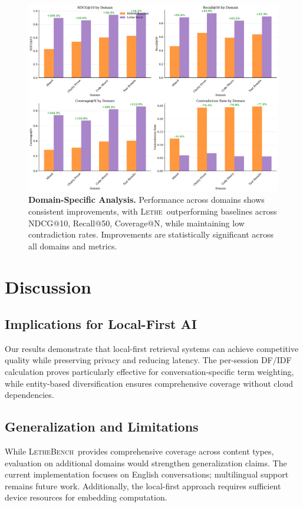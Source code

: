 \documentclass[letterpaper]{article}
\newcommand{\lethe}{\textsc{Lethe}}
\newcommand{\lethebench}{\textsc{LetheBench}}
\begin{document}
\begin{figure}[t]
\centering
\includegraphics[width=\textwidth]{figures/domain_performance}
\caption{\textbf{Domain-Specific Analysis.} Performance across domains shows consistent improvements, with \lethe\ outperforming baselines across NDCG@10, Recall@50, Coverage@N, while maintaining low contradiction rates. Improvements are statistically significant across all domains and metrics.}
\label{fig:domain-performance}
\end{figure}

\section{Discussion}

\subsection{Implications for Local-First AI}

Our results demonstrate that local-first retrieval systems can achieve competitive quality while preserving privacy and reducing latency. The per-session DF/IDF calculation proves particularly effective for conversation-specific term weighting, while entity-based diversification ensures comprehensive coverage without cloud dependencies.

\subsection{Generalization and Limitations}

While \lethebench\ provides comprehensive coverage across content types, evaluation on additional domains would strengthen generalization claims. The current implementation focuses on English conversations; multilingual support remains future work. Additionally, the local-first approach requires sufficient device resources for embedding computation.
\end{document}
